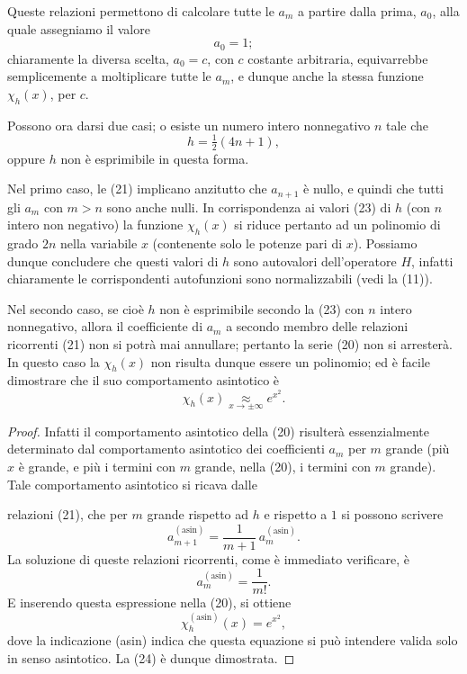 \documentclass[11pt, a4paper]{book}
\numberwithin{equation}{section}
\begin{document}
Queste relazioni permettono di calcolare tutte le $a_m$ a partire dalla
prima, $a_0$, alla quale assegniamo il valore
\begin{equation}
a_0 = 1;
\end{equation}
chiaramente la diversa scelta, $a_0 = c$, con $c$ costante arbitraria,
equivarrebbe semplicemente a moltiplicare tutte le $a_m$, e dunque anche
la stessa funzione $\chi_h(x)$, per $c$.

Possono ora darsi due casi; o esiste un numero intero nonnegativo $n$
tale che
\begin{equation}
h = \tfrac{1}{2}(4n+1),
\end{equation}
oppure $h$ non è esprimibile in questa forma.

Nel primo caso, le (21) implicano anzitutto che $a_{n+1}$ è nullo, e
quindi che tutti gli $a_m$ con $m > n$ sono anche nulli. In corrispondenza
ai valori (23) di $h$ (con $n$ intero non negativo) la funzione $\chi_h(x)$
si riduce pertanto ad un polinomio di grado $2n$ nella variabile $x$
(contenente solo le potenze pari di $x$). Possiamo dunque concludere che
questi valori di $h$ sono autovalori dell'operatore $H$, infatti
chiaramente le corrispondenti autofunzioni sono normalizzabili (vedi la
(11)).

Nel secondo caso, se cioè $h$ non è esprimibile secondo la (23) con $n$
intero nonnegativo, allora il coefficiente di $a_m$ a secondo membro delle
relazioni ricorrenti (21) non si potrà mai annullare; pertanto la serie
(20) non si arresterà. In questo caso la $\chi_h(x)$ non risulta dunque
essere un polinomio; ed è facile dimostrare che il suo comportamento
asintotico è
\begin{equation}
\chi_h(x) \underset{x\to\pm\infty}{\approx} e^{x^2}.
\end{equation}

\begin{proof}
Infatti il comportamento asintotico della (20) risulterà essenzialmente
determinato dal comportamento asintotico dei coefficienti $a_m$ per $m$
grande (più $x$ è grande, e più i termini con $m$ grande, nella (20), i
termini con $m$ grande). Tale comportamento asintotico si ricava dalle


relazioni (21), che per $m$ grande rispetto ad $h$ e rispetto a $1$ si
possono scrivere
\[
a_{m+1}^{(\text{asin})} = \frac{1}{m+1}\,a_m^{(\text{asin})}.
\]
La soluzione di queste relazioni ricorrenti, come è immediato verificare, è
\[
a_m^{(\text{asin})} = \frac{1}{m!}.
\]
E inserendo questa espressione nella (20), si ottiene
\[
\chi_h^{(\text{asin})}(x) = e^{x^2},
\]
dove la indicazione (asin) indica che questa equazione si può intendere
valida solo in senso asintotico. La (24) è dunque dimostrata.
\end{proof}
\end{document}
